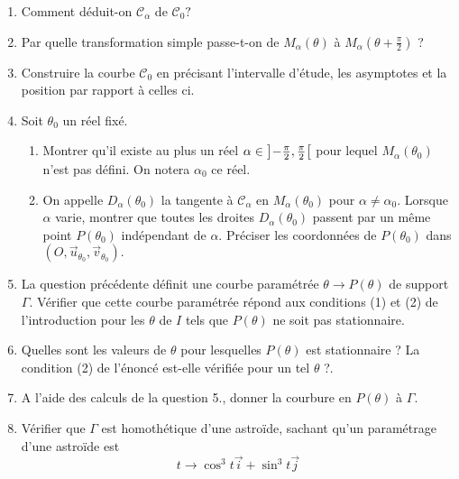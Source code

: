 \begin{enumerate}
\item  Comment d\'{e}duit-on $\mathcal{C}_{\alpha }$ de $\mathcal{C}_{0}?$

\item  Par quelle transformation simple passe-t-on de $M_{\alpha }(\theta )$
\`{a} $M_{\alpha }(\theta +\frac{\pi }{2})$ ?

\item  Construire la courbe $\mathcal{C}_{0}$ en pr\'{e}cisant l'intervalle
d'\'{e}tude, les asymptotes et la position par rapport \`{a} celles ci.

\item  Soit $\theta _{0}$ un r\'{e}el fix\'{e}.

\begin{enumerate}
\item  Montrer qu'il existe au plus un r\'{e}el $\alpha \in \left] -\frac{%
\pi }{2},\frac{\pi }{2}\right[ $ pour lequel $M_{\alpha }(\theta _{0})$
n'est pas d\'{e}fini. On notera $\alpha _{0}$ ce r\'{e}el.

\item  On appelle $D_{\alpha }(\theta _{0})$ la tangente \`{a} $\mathcal{C}%
_{\alpha }$ en $M_{\alpha }(\theta _{0})$ pour $\alpha \neq \alpha _{0}$.
Lorsque $\alpha $ varie, montrer que toutes les droites $D_{\alpha }(\theta
_{0})$ passent par un m\^{e}me point $P(\theta _{0})$ ind\'{e}pendant de $%
\alpha $. Pr\'{e}ciser les coordonn\'{e}es de $P(\theta _{0})$ dans $(O,%
\overrightarrow{u}_{\theta _{0}},\overrightarrow{v}_{\theta _{0}}).$
\end{enumerate}

\item  La question pr\'{e}c\'{e}dente d\'{e}finit une courbe
param\'{e}tr\'{e}e $\theta \rightarrow P(\theta )$ de support $\Gamma $.
V\'{e}rifier que cette courbe param\'{e}tr\'{e}e r\'{e}pond aux conditions
(1) et (2) de l'introduction pour les $\theta $ de $I$ tels que $P(\theta )$
ne soit pas stationnaire.

\item  Quelles sont les valeurs de $\theta $ pour lesquelles $P(\theta )$
est stationnaire ? La condition (2) de l'\'{e}nonc\'{e} est-elle
v\'{e}rifi\'{e}e pour un tel $\theta $ ?.

\item  A l'aide des calculs de la question 5., donner la courbure en $%
P(\theta )$ \`{a} $\Gamma $.

\item  V\'{e}rifier que $\Gamma $ est homoth\'{e}tique d'une astro\"{i}de,
sachant qu'un param\'{e}trage d'une astro\"{i}de est 
\[
t\rightarrow \cos ^{3}t\overrightarrow{i}+\sin ^{3}t\overrightarrow{j} 
\]
\end{enumerate}

